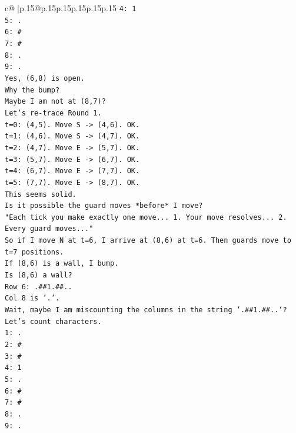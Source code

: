 \documentclass{article}
\begin{document}
{\begin{supertabular}{c@{$\;$}|p{.15\linewidth}@{}p{.15\linewidth}p{.15\linewidth}p{.15\linewidth}p{.15\linewidth}p{.15\linewidth}}
{{{\texttt{4: 1} \\
\texttt{5: .} \\
\texttt{6: \#} \\
\texttt{7: \#} \\
\texttt{8: .} \\
\texttt{9: .} \\
\texttt{Yes, (6,8) is open.} \\
\texttt{Why the bump?} \\
\texttt{Maybe I am not at (8,7)?} \\
\texttt{Let's re{-}trace Round 1.} \\
\texttt{t=0: (4,5). Move S {-}> (4,6). OK.} \\
\texttt{t=1: (4,6). Move S {-}> (4,7). OK.} \\
\texttt{t=2: (4,7). Move E {-}> (5,7). OK.} \\
\texttt{t=3: (5,7). Move E {-}> (6,7). OK.} \\
\texttt{t=4: (6,7). Move E {-}> (7,7). OK.} \\
\texttt{t=5: (7,7). Move E {-}> (8,7). OK.} \\
\texttt{This seems solid.} \\
\texttt{Is it possible the guard moves *before* I move?} \\
\texttt{"Each tick you make exactly one move... 1. Your move resolves... 2. Every guard moves..."} \\
\texttt{So if I move N at t=6, I arrive at (8,6) at t=6. Then guards move to t=7 positions.} \\
\texttt{If (8,6) is a wall, I bump.} \\
\texttt{Is (8,6) a wall?} \\
\texttt{Row 6: .\#\#1.\#\#..} \\
\texttt{Col 8 is '.'.} \\
\texttt{Wait, maybe I am miscounting the columns in the string `.\#\#1.\#\#..`?} \\
\texttt{Let's count characters.} \\
\texttt{1: .} \\
\texttt{2: \#} \\
\texttt{3: \#} \\
\texttt{4: 1} \\
\texttt{5: .} \\
\texttt{6: \#} \\
\texttt{7: \#} \\
\texttt{8: .} \\
\texttt{9: .} \\
}}}
\end{supertabular}}
\end{document}
